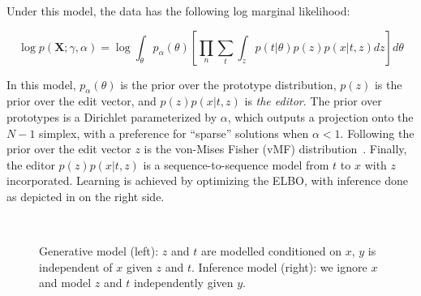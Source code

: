 Under this model, the data has the following log marginal likelihood:

\begin{equation}
    \log p(\bm{X} ; \gamma, \alpha) =
    \log \int_\theta p_\alpha (\theta)
    \left[ \prod_n \sum_{t} \int_{z}
        p(t | \theta) p(z) p(x | t, z)
        dz \right] d\theta
\end{equation}

In this model, $p_\alpha(\theta)$ is the prior over the prototype
distribution, $p(z)$ is the prior over the edit vector, and
$p(z) p(x | t, z)$ is {\it the editor}.
The prior over prototypes is a Dirichlet parameterized by $\alpha$,
which outputs a projection onto the $N-1$ simplex, with a preference
for ``sparse'' solutions when $\alpha<1$. Following
\citet{guu2018GeneratingSentencesEditing} the prior over the edit
vector $z$ is the von-Mises Fisher (vMF)
distribution~\citep{s-vae18}. Finally, the editor
$p(z) p(x | t, z)$ is a
sequence-to-sequence model from $t$ to $x$ with
$z$ incorporated. Learning is achieved by optimizing the ELBO,
with inference done as depicted in
 on the right side.

\begin{figure}[t]
    \centering

    ~

    \caption{Generative model (left): $z$ and $t$ are modelled
        conditioned on $x$, $y$ is independent of $x$ given $z$ and $t$.
        Inference model (right): we ignore $x$ and model $z$ and $t$
        independently given $y$.} \label{fig:conditional}
\end{figure}

